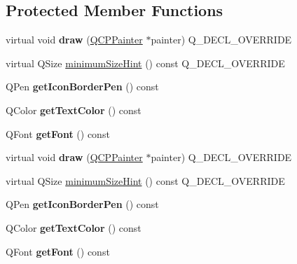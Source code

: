 \subsection*{Protected Member Functions}
\begin{DoxyCompactItemize}
\item 
virtual void {\bfseries draw} (\hyperlink{class_q_c_p_painter}{Q\+C\+P\+Painter} $\ast$painter) Q\+\_\+\+D\+E\+C\+L\+\_\+\+O\+V\+E\+R\+R\+I\+DE\hypertarget{class_q_c_p_plottable_legend_item_a5838366619200e99680afa6d355d13fa}{}\label{class_q_c_p_plottable_legend_item_a5838366619200e99680afa6d355d13fa}

\item 
virtual Q\+Size \hyperlink{class_q_c_p_plottable_legend_item_a923b8b0e2b888cbb00abae0783edf509}{minimum\+Size\+Hint} () const Q\+\_\+\+D\+E\+C\+L\+\_\+\+O\+V\+E\+R\+R\+I\+DE
\item 
Q\+Pen {\bfseries get\+Icon\+Border\+Pen} () const \hypertarget{class_q_c_p_plottable_legend_item_ab36270e6b022a6961fa44136f35c0e4b}{}\label{class_q_c_p_plottable_legend_item_ab36270e6b022a6961fa44136f35c0e4b}

\item 
Q\+Color {\bfseries get\+Text\+Color} () const \hypertarget{class_q_c_p_plottable_legend_item_ad762b07439c738660ba93e78c1d03667}{}\label{class_q_c_p_plottable_legend_item_ad762b07439c738660ba93e78c1d03667}

\item 
Q\+Font {\bfseries get\+Font} () const \hypertarget{class_q_c_p_plottable_legend_item_a8a85c8a25affb4895423d730164d61de}{}\label{class_q_c_p_plottable_legend_item_a8a85c8a25affb4895423d730164d61de}

\item 
virtual void {\bfseries draw} (\hyperlink{class_q_c_p_painter}{Q\+C\+P\+Painter} $\ast$painter) Q\+\_\+\+D\+E\+C\+L\+\_\+\+O\+V\+E\+R\+R\+I\+DE\hypertarget{class_q_c_p_plottable_legend_item_a89a793361a12a3e263b59f5c680e96ee}{}\label{class_q_c_p_plottable_legend_item_a89a793361a12a3e263b59f5c680e96ee}

\item 
virtual Q\+Size \hyperlink{class_q_c_p_plottable_legend_item_a07b5cd301f1ec07ae0d6e6dde1e564b3}{minimum\+Size\+Hint} () const Q\+\_\+\+D\+E\+C\+L\+\_\+\+O\+V\+E\+R\+R\+I\+DE
\item 
Q\+Pen {\bfseries get\+Icon\+Border\+Pen} () const \hypertarget{class_q_c_p_plottable_legend_item_ab36270e6b022a6961fa44136f35c0e4b}{}\label{class_q_c_p_plottable_legend_item_ab36270e6b022a6961fa44136f35c0e4b}

\item 
Q\+Color {\bfseries get\+Text\+Color} () const \hypertarget{class_q_c_p_plottable_legend_item_ad762b07439c738660ba93e78c1d03667}{}\label{class_q_c_p_plottable_legend_item_ad762b07439c738660ba93e78c1d03667}

\item 
Q\+Font {\bfseries get\+Font} () const \hypertarget{class_q_c_p_plottable_legend_item_a8a85c8a25affb4895423d730164d61de}{}\label{class_q_c_p_plottable_legend_item_a8a85c8a25affb4895423d730164d61de}

\end{DoxyCompactItemize}
